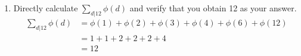 \documentclass{hw}
\begin{document}

\begin{enumerate}
\item Directly calculate $\displaystyle\sum\limits_{d|12}\phi(d)$ and verify that you obtain 12 as your
answer.
\begin{align*}
\sum_{d|12}\phi(d) &= \phi(1) + \phi(2) + \phi(3) + \phi(4) + \phi(6) + \phi(12)\\
&= 1 + 1 + 2 + 2 + 2 + 4\\
&= 12
\end{align*}
\end{enumerate}
\end{document}
